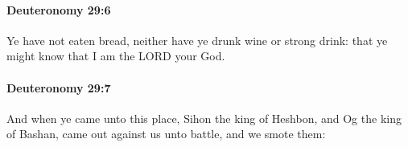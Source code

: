 		\paragraph{Deuteronomy 29:6} %
			\label{DEUTERONOMY-29-6}

			Ye have not eaten bread, neither have ye drunk wine or strong drink: that ye might know that I am the LORD your God.


		\paragraph{Deuteronomy 29:7} %
			\label{DEUTERONOMY-29-7}

			And when ye came unto this place, Sihon the king of Heshbon, and Og the king of Bashan, came out against us unto battle, and we smote them:


